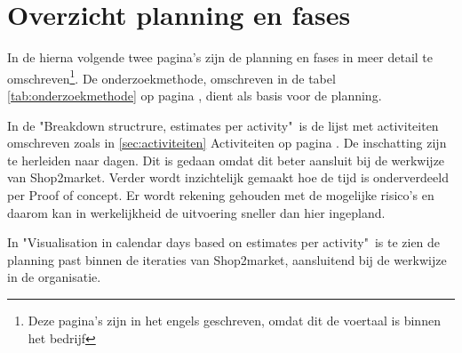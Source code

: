 
\chapter{Overzicht planning en fases}
\label{app:planning}

In de hierna volgende twee pagina's zijn de planning en fases in meer detail te omschreven\footnote{ Deze pagina's zijn in het engels geschreven, omdat dit de voertaal is binnen het bedrijf }. De onderzoekmethode, omschreven in de tabel \ref{tab:onderzoekmethode} op pagina \pageref{tab:onderzoekmethode}, dient als basis voor de planning.
\newline

In de "Breakdown structrure, estimates per activity"\ is de lijst met activiteiten omschreven zoals in \ref{sec:activiteiten} Activiteiten op pagina \pageref{sec:activiteiten}. De inschatting zijn te herleiden naar dagen. Dit is gedaan omdat dit beter aansluit bij de werkwijze van Shop2market. 
Verder wordt inzichtelijk gemaakt hoe de tijd is onderverdeeld per Proof of concept. Er wordt rekening gehouden met de mogelijke risico's en daarom kan in werkelijkheid de uitvoering sneller dan hier ingepland.
\newline

In "Visualisation in calendar days based on estimates per activity"\ is te zien de planning past binnen de iteraties van Shop2market, aansluitend bij de werkwijze in de organisatie.


